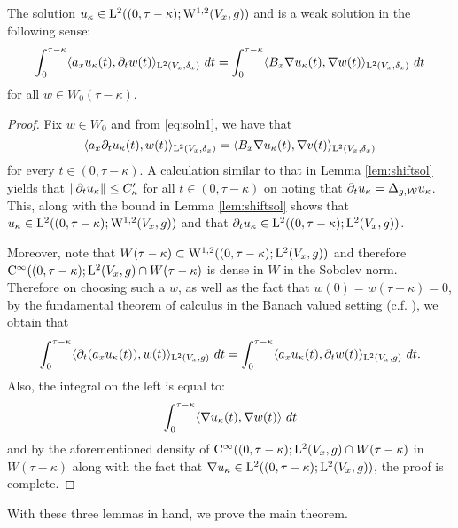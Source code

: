 \documentclass[a4paper, 12pt]{amsart}
\begin{document}
\begin{lemma}
The solution $u_\kappa \in {\rm L}^{2}_{\rm {}}((0, \tau - \kappa); {{\rm W}^{1,2}_{\rm {}}}(V_x, g))$
and is a weak solution in the following sense:
\begin{equation}
\label{eq:testfn2} 
\int_{0}^{\tau - \kappa} \langle a_x u_\kappa(t), \partial_t w(t) \rangle_{{\rm L}^{2}_{\rm {}}(V_x,\delta_x)}\ dt 
		= \int_{0}^{\tau - \kappa } \langle B_x \nabla u_\kappa(t), \nabla w(t) \rangle_{{\rm L}^{2}_{\rm {}}(V_x, \delta_x)}\ dt
\end{equation}
for all $w \in W_0(\tau - \kappa)$.
\end{lemma}
\begin{proof}
Fix $w \in W_0$ and from \eqref{eq:soln1}, we have that
$$\langle a_x \partial_t u_\kappa (t), w(t) \rangle_{{\rm L}^{2}_{\rm {}}(V_x, \delta_x)} 
		= \langle  B_x \nabla u_\kappa(t), \nabla v(t) \rangle_{{\rm L}^{2}_{\rm {}}(V_x, \delta_x)}$$
for every $t \in (0, \tau - \kappa)$.
A calculation similar to that in Lemma \ref{lem:shiftsol} 
yields that $\|  \partial_t u_\kappa \| \leq C_\kappa'$
for all $t \in (0, \tau - \kappa)$
on noting that $\partial_t u_\kappa = \Delta_{g,\mathcal{W}} u_\kappa$.
This, along with the bound in Lemma \ref{lem:shiftsol}
shows that  $u_\kappa \in {\rm L}^{2}_{\rm {}}((0, \tau - \kappa); {{\rm W}^{1,2}_{\rm {}}}(V_x, g))$
and that $\partial_t u_\kappa \in {\rm L}^{2}_{\rm {}}((0,\tau - \kappa); {\rm L}^{2}_{\rm {}}(V_x, g))$. 

Moreover, note that $W(\tau- \kappa) \subset {{\rm W}^{1,2}_{\rm {}}}((0,\tau-\kappa); {\rm L}^{2}_{\rm {}}(V_x,g))$
and therefore ${\rm C}^{\infty}_{\rm {}}((0,\tau-\kappa); {\rm L}^{2}_{\rm {}}(V_x,g) \cap W(\tau - \kappa)$
is dense in $W$ in the Sobolev norm. Therefore on 
choosing such a $w$, as well as the fact that $w(0) = w(\tau - \kappa) = 0$, 
by the fundamental theorem of calculus in the Banach 
valued setting (c.f. \cite{}), we obtain that
$$\int_{0}^{\tau - \kappa} \langle  \partial_t(a_x u_\kappa(t)), w(t) \rangle_{{\rm L}^{2}_{\rm {}}(V_x,g)}\ dt
	= \int_0^{\tau - \kappa} \langle a_x u_\kappa(t), \partial_t w(t) \rangle_{{\rm L}^{2}_{\rm {}}(V_x, g)}\ dt.$$
Also, the integral on the left is equal to:
$$\int_{0}^{\tau - \kappa} \langle  \nabla u_\kappa(t), \nabla w(t) \rangle\ dt$$
and by the aforementioned density of
 ${\rm C}^{\infty}_{\rm {}}((0,\tau-\kappa); {\rm L}^{2}_{\rm {}}(V_x,g) \cap W(\tau - \kappa)$ 
in $W(\tau - \kappa)$ along with the fact that $\nabla u_\kappa \in {\rm L}^{2}_{\rm {}}((0, \tau - \kappa); {\rm L}^{2}_{\rm {}}(V_x,g))$,
the proof is complete.
\end{proof} 

With these three lemmas in hand, we prove
the main theorem. 
\end{document}
